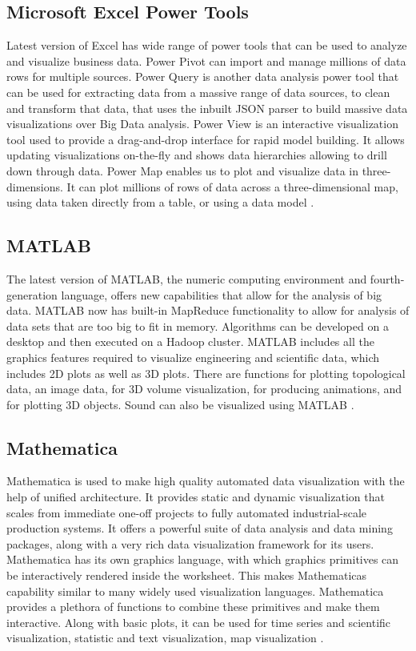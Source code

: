 \subsection{Microsoft Excel Power Tools}

Latest version of Excel has wide range of power tools that can be used to analyze and visualize business data. Power Pivot can import and manage millions of data rows for multiple sources. Power Query is another data analysis power tool that can be used for extracting data from a massive range of data sources, to clean and transform that data, that uses the inbuilt JSON parser to build massive data visualizations over Big Data analysis. Power View is an interactive visualization tool used to provide a drag-and-drop interface for rapid model building. It allows updating visualizations on-the-fly and shows data hierarchies allowing to drill down through data. Power Map enables us to plot and visualize data in  three-dimensions. It can plot millions of rows of data across a three-dimensional map, using data taken directly from a table, or using a data model \cite{Excel}.

\subsection{MATLAB}

The latest version of MATLAB, the numeric computing environment and fourth-generation language, offers new capabilities that allow for the analysis of big data. MATLAB now has built-in MapReduce functionality to allow for analysis of data sets that are too big to fit in memory. Algorithms can be developed on a desktop and then executed on a Hadoop cluster. MATLAB includes all the graphics features required to visualize engineering and scientific data, which includes 2D plots as well as 3D plots. There are functions for plotting topological data, an image data, for 3D volume visualization, for producing animations, and for plotting 3D objects. Sound can also be visualized using MATLAB \cite{MATLAB}.

\subsection{Mathematica}

Mathematica is used to make high quality automated data visualization with the help of unified architecture. It provides static and dynamic visualization that scales from immediate one-off projects to fully automated industrial-scale production systems. It	offers a powerful suite	of data	analysis and data mining packages, along with a	very rich data visualization framework for its users. Mathematica has its own graphics language,	with which graphics	primitives can be interactively	rendered inside	the	worksheet. This makes Mathematicas	capability similar to many widely used visualization languages.	Mathematica	provides a plethora	of functions to	combine	these primitives and make them interactive. Along with basic plots, it can be used for time series and scientific visualization, statistic and text visualization, map visualization \cite{Mathematica}.\\

